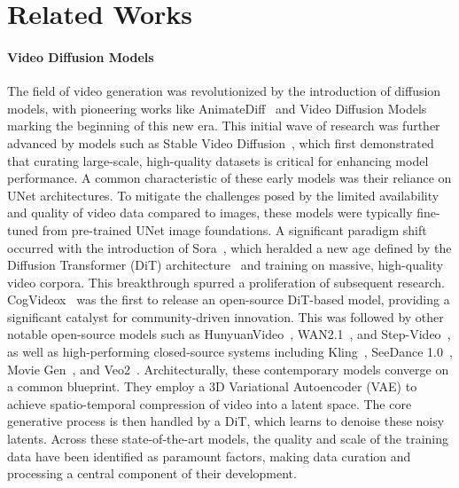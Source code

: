 \section{Related Works}
\paragraph{Video Diffusion Models} The field of video generation was revolutionized by the introduction of diffusion models, with pioneering works like AnimateDiff~\cite{guo2023animatediff} and Video Diffusion Models~\cite{ho2022video} marking the beginning of this new era. This initial wave of research was further advanced by models such as Stable Video Diffusion~\cite{blattmann2023stable}, which first demonstrated that curating large-scale, high-quality datasets is critical for enhancing model performance. A common characteristic of these early models was their reliance on UNet architectures. To mitigate the challenges posed by the limited availability and quality of video data compared to images, these models were typically fine-tuned from pre-trained UNet image foundations.
A significant paradigm shift occurred with the introduction of Sora~\cite{openaisora2024}, which heralded a new age defined by the Diffusion Transformer (DiT) architecture~\cite{peebles2023scalable} and training on massive, high-quality video corpora. This breakthrough spurred a proliferation of subsequent research. CogVideox~\cite{yang2024cogvideox} was the first to release an open-source DiT-based model, providing a significant catalyst for community-driven innovation. This was followed by other notable open-source models such as HunyuanVideo~\cite{kong2024hunyuanvideo}, WAN2.1~\cite{wan2025wan}, and Step-Video~\cite{ma2025step}, as well as high-performing closed-source systems including Kling~\cite{kuaishou2024kling}, SeeDance 1.0~\cite{gao2025seedance}, Movie Gen~\cite{polyak2024movie}, and Veo2~\cite{veo22025}.
Architecturally, these contemporary models converge on a common blueprint. They employ a 3D Variational Autoencoder (VAE) to achieve spatio-temporal compression of video into a latent space. The core generative process is then handled by a DiT, which learns to denoise these noisy latents. Across these state-of-the-art models, the quality and scale of the training data have been identified as paramount factors, making data curation and processing a central component of their development.

